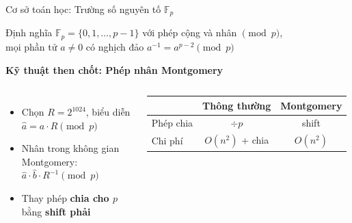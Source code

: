 \begin{frame}{Cơ sở toán học: Trường số nguyên tố $\mathbb{F}_p$}
  \begin{block}{Định nghĩa}
    $\mathbb{F}_p = \{0,1,\ldots,p{-}1\}$ với phép cộng và nhân $\pmod{p}$,\\
    mọi phần tử $a \neq 0$ có nghịch đảo $a^{-1} = a^{p-2} \pmod{p}$
  \end{block}
  \vspace{0.5em}
  \textbf{Kỹ thuật then chốt: Phép nhân Montgomery}
  \begin{columns}[c]
      \begin{itemize}
        \item Chọn $R = 2^{1024}$, biểu diễn $\hat{a} = a \cdot R \pmod{p}$
        \item Nhân trong không gian Montgomery:\\
              $\hat{a} \cdot \hat{b} \cdot R^{-1} \pmod{p}$
        \item Thay phép \textbf{chia cho $p$} bằng \textbf{shift phải}
      \end{itemize}
      \begin{table}
        \small
        \begin{tabular}{lcc}
          \toprule
          & Thông thường & Montgomery \\
          \midrule
          Phép chia & $\div p$ & shift \\
          Chi phí & $O(n^2)$ + chia & $O(n^2)$ \\
          \bottomrule
        \end{tabular}
      \end{table}
  \end{columns}
\end{frame}
